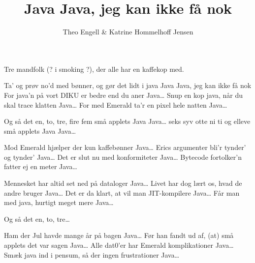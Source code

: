 \documentclass[a4paper,11pt]{article}
\title{Java Java, jeg kan ikke få nok}
\author{Theo Engell \& Katrine Hommelhoff Jensen}
\begin{document}
\maketitle

\begin{roles}
   Tre mandfolk (? i smoking ?), der alle har en kaffekop med.
\end{roles}

\begin{song}
 Ta' og prøv no'd med bønner, og gør det lidt i java
 Java Java, jeg kan ikke få nok
 For java'n på vort DIKU er bedre end du aner
        Java\ldots
{} Snup en kop java, når du skal trace klatten
        Java\ldots
{} For med Emerald ta'r en pixel hele natten
        Java\ldots

 Og så det en, to, tre, fire fem små applets
        Java Java\ldots
        seks syv otte ni ti og elleve små applets
        Java Java\ldots

 Mod Emerald hjælper der kun kaffebønner
Java\ldots
{} Erics argumenter bli'r tynder' og tynder'
Java\ldots
{} Det er slut nu med konformiteter
Java\ldots
{} Bytecode fortolker'n fatter ej en meter
Java\ldots

Mennesket har altid set ned på dataloger 
Java\ldots
{}Livet har dog lært os, hvad de andre bruger
Java\ldots
{} Det er da klart, at vil man JIT-kompilere
Java\ldots
{} Får man med java, hurtigt meget mere
Java\ldots

 Og så det en, to, tre\ldots

Ham der Jul havde mange år på bagen
Java\ldots
{}Før han fandt ud af, (at) små applets det var sagen
Java\ldots
{}Alle dat0'er har Emerald komplikationer
Java\ldots
{}Smæk java ind i pensum, så der ingen frustrationer
Java\ldots

\end{song}
\end{document}
